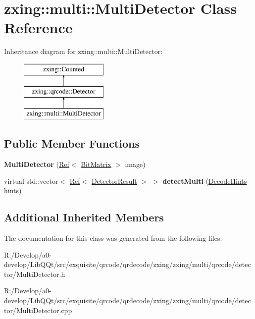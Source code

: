 \hypertarget{classzxing_1_1multi_1_1_multi_detector}{}\section{zxing\+:\+:multi\+:\+:Multi\+Detector Class Reference}
\label{classzxing_1_1multi_1_1_multi_detector}
Inheritance diagram for zxing\+:\+:multi\+:\+:Multi\+Detector\+:\begin{figure}[H]
\begin{center}
\leavevmode
\includegraphics[height=3.000000cm]{classzxing_1_1multi_1_1_multi_detector}
\end{center}
\end{figure}
\subsection*{Public Member Functions}
\begin{DoxyCompactItemize}
\item 
\mbox{\label{classzxing_1_1multi_1_1_multi_detector_ac990908a8a7f3e69cecef1eb86e18aa1}} 
{\bfseries Multi\+Detector} (\mbox{\hyperlink{classzxing_1_1_ref}{Ref}}$<$ \mbox{\hyperlink{classzxing_1_1_bit_matrix}{Bit\+Matrix}} $>$ image)
\item 
\mbox{\label{classzxing_1_1multi_1_1_multi_detector_a66b1b2bf08dded4686c8a0cbff359721}} 
virtual std\+::vector$<$ \mbox{\hyperlink{classzxing_1_1_ref}{Ref}}$<$ \mbox{\hyperlink{classzxing_1_1_detector_result}{Detector\+Result}} $>$ $>$ {\bfseries detect\+Multi} (\mbox{\hyperlink{classzxing_1_1_decode_hints}{Decode\+Hints}} hints)
\end{DoxyCompactItemize}
\subsection*{Additional Inherited Members}


The documentation for this class was generated from the following files\+:\begin{DoxyCompactItemize}
\item 
R\+:/\+Develop/a0-\/develop/\+Lib\+Q\+Qt/src/exquisite/qrcode/qrdecode/zxing/zxing/multi/qrcode/detector/Multi\+Detector.\+h\item 
R\+:/\+Develop/a0-\/develop/\+Lib\+Q\+Qt/src/exquisite/qrcode/qrdecode/zxing/zxing/multi/qrcode/detector/Multi\+Detector.\+cpp\end{DoxyCompactItemize}
